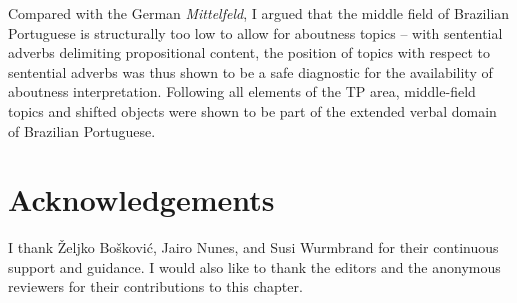 \documentclass[output=paper]{langscibook}
\begin{document}
Compared with the German \emph{Mittelfeld}, I argued that the middle field of Brazilian Portuguese is structurally too low to allow for aboutness topics -- with sentential adverbs delimiting propositional content, the position of topics with respect to sentential adverbs was thus shown to be a safe diagnostic for the availability of aboutness interpretation. Following all elements of the TP area, middle-field topics and shifted objects were shown to be part of the extended verbal domain of Brazilian Portuguese.

\begin{comment}
\newpage
\section*{Abbreviations}
\begin{tabularx}{.45\textwidth}{lQ}
... & \\
... & \\
\end{tabularx}
\begin{tabularx}{.45\textwidth}{lQ}
... & \\
... & \\
\end{tabularx}
\end{comment}

\section*{Acknowledgements}
I thank Željko Bošković, Jairo Nunes, and Susi Wurmbrand for their continuous support and guidance. 
I would also like to thank the editors and the anonymous reviewers for their contributions to this chapter.

\printbibliography[heading=subbibliography,notkeyword=this]
\end{document}
